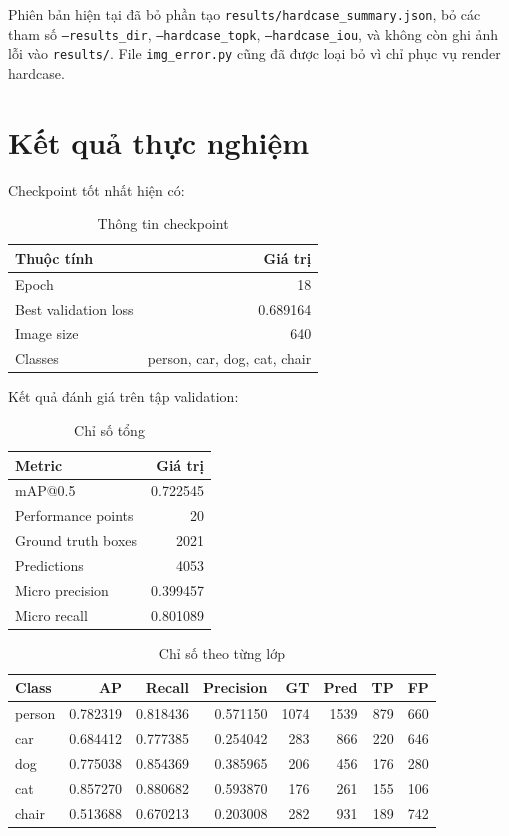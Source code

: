 \documentclass[12pt,a4paper]{article}
\begin{document}
Phiên bản hiện tại đã bỏ phần tạo \texttt{results/hardcase\_summary.json}, bỏ các tham số \texttt{--results\_dir}, \texttt{--hardcase\_topk}, \texttt{--hardcase\_iou}, và không còn ghi ảnh lỗi vào \texttt{results/}. File \texttt{img\_error.py} cũng đã được loại bỏ vì chỉ phục vụ render hardcase.

\section{Kết quả thực nghiệm}

Checkpoint tốt nhất hiện có:

\begin{table}[h]
\centering
\caption{Thông tin checkpoint}
\begin{tabular}{lr}
\toprule
Thuộc tính & Giá trị \\
\midrule
Epoch & 18 \\
Best validation loss & 0.689164 \\
Image size & 640 \\
Classes & person, car, dog, cat, chair \\
\bottomrule
\end{tabular}
\end{table}

Kết quả đánh giá trên tập validation:

\begin{table}[h]
\centering
\caption{Chỉ số tổng}
\begin{tabular}{lr}
\toprule
Metric & Giá trị \\
\midrule
mAP@0.5 & 0.722545 \\
Performance points & 20 \\
Ground truth boxes & 2021 \\
Predictions & 4053 \\
Micro precision & 0.399457 \\
Micro recall & 0.801089 \\
\bottomrule
\end{tabular}
\end{table}

\begin{table}[h]
\centering
\caption{Chỉ số theo từng lớp}
\begin{tabular}{lrrrrrrr}
\toprule
Class & AP & Recall & Precision & GT & Pred & TP & FP \\
\midrule
person & 0.782319 & 0.818436 & 0.571150 & 1074 & 1539 & 879 & 660 \\
car & 0.684412 & 0.777385 & 0.254042 & 283 & 866 & 220 & 646 \\
dog & 0.775038 & 0.854369 & 0.385965 & 206 & 456 & 176 & 280 \\
cat & 0.857270 & 0.880682 & 0.593870 & 176 & 261 & 155 & 106 \\
chair & 0.513688 & 0.670213 & 0.203008 & 282 & 931 & 189 & 742 \\
\bottomrule
\end{tabular}
\end{table}
\end{document}
